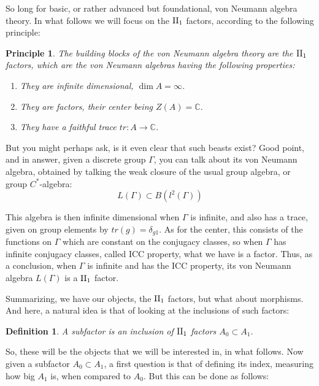 \documentclass[12pt]{amsbook}
\newtheorem{definition}[theorem]{Definition}
\newtheorem{principle}[theorem]{Principle}
\begin{document}
So long for basic, or rather advanced but foundational, von Neumann algebra theory. In what follows we will focus on the ${\rm II}_1$ factors, according to the following principle:

\begin{principle}
The building blocks of the von Neumann algebra theory are the ${\rm II}_1$ factors, which are the von Neumann algebras having the following properties:
\begin{enumerate}
\item They are infinite dimensional, $\dim A=\infty$.

\item They are factors, their center being $Z(A)=\mathbb C$.

\item They have a faithful trace $tr:A\to\mathbb C$.
\end{enumerate}
\end{principle}

But you might perhaps ask, is it even clear that such beasts exist? Good point, and in answer, given a discrete group $\Gamma$, you can talk about its von Neumann algebra, obtained by talking the weak closure of the usual group algebra, or group $C^*$-algebra:
$$L(\Gamma)\subset B(l^2(\Gamma))$$

This algebra is then infinite dimensional when $\Gamma$ is infinite, and also has a trace, given on group elements by $tr(g)=\delta_{g1}$. As for the center, this consists of the functions on $\Gamma$ which are constant on the conjugacy classes, so when $\Gamma$ has infinite conjugacy classes, called ICC property, what we have is a factor. Thus, as a conclusion, when $\Gamma$ is infinite and has the ICC property, its von Neumann algebra $L(\Gamma)$ is a ${\rm II}_1$ factor.

\bigskip

Summarizing, we have our objects, the ${\rm II}_1$ factors, but what about morphisms. And here, a natural idea is that of looking at the inclusions of such factors:

\begin{definition}
A subfactor is an inclusion of ${\rm II}_1$ factors $A_0\subset A_1$.
\end{definition}

So, these will be the objects that we will be interested in, in what follows. Now given a subfactor $A_0\subset A_1$, a first question is that of defining its index, measuring how big $A_1$ is, when compared to $A_0$. But this can be done as follows:
\end{document}
